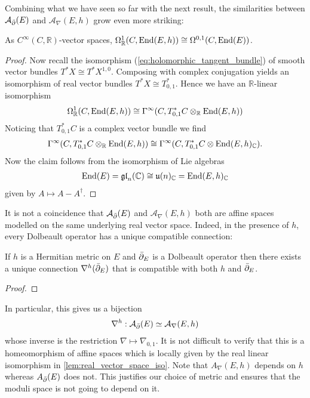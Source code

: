 \documentclass[12pt]{ociamthesis}  %
\begin{document}
Combining what we have seen so far with the next result, the
similarities between $\mathcal A_{\bar{\partial}} (E)$ and $\mathcal A_\nabla(E,h)$ grow even more
striking:

\begin{lemma}\label{lem:real_vector_space_iso}
  As $C^\infty(C,\mathbb R)$-vector spaces,
  $\Omega^1_{\mathbb{R}}(C,\operatorname{End}(E,h))\cong\Omega^{0,1}(C,\operatorname{End}(E))$.
  \begin{proof}
    Now recall the isomorphism (\ref{eq:holomorphic_tangent_bundle}) of
    smooth vector bundles $T^* X \cong T^*X^{1,0}$. Composing with
    complex conjugation yields an isomorphism of real vector bundles
    $T^*X \cong T^*_{0,1}$. Hence we have an $\mathbb{R}$-linear
    isomorphism
    \begin{align*}
      \Omega^1_{\mathbb{R}}(C,\operatorname{End}(E,h))
      \cong \Gamma^\infty(C,T^*_{0,1}C \otimes_{\mathbb{R}}\operatorname{End}(E,h))
    \end{align*}
    Noticing that $T_{0,1}^* C$ is a complex vector bundle
    we find
    \begin{align*}
      \Gamma^\infty(C,T^*_{0,1}C \otimes_{\mathbb{R}}\operatorname{End}(E,h))
      \cong\Gamma^\infty(C,T^*_{0,1}C \otimes\operatorname{End}(E,h)_{\mathbb{C}}).
    \end{align*}
    Now the claim follows from the isomorphism of Lie algebras
    \begin{align*}
      \operatorname{End}(E)
      =\mathfrak{gl}_n(\mathbb{C})
      \cong\mathfrak u(n)_{\mathbb{C}}
      =\operatorname{End}(E,h)_{\mathbb C}
    \end{align*}
    given by $A \mapsto A-A^\dagger$.
  \end{proof}
\end{lemma}

It is not a coincidence that $\mathcal A_{\bar{\partial}} (E)$ and $\mathcal A_\nabla(E,h)$ both are
affine spaces modelled on the same underlying real vector space.
Indeed, in the presence of $h$, every Dolbeault operator has a unique
compatible connection:

\begin{theorem}\label{thm:chern_connection}
  If $h$ is a Hermitian metric on $E$ and ${\bar{\partial}}_E$ is a Dolbeault
  operator then there exists a unique connection $\nabla^h({\bar{\partial}}_E)$
  that is compatible with both $h$ and ${\bar{\partial}}_E$.
  \begin{proof}
    \missingproof
  \end{proof}
\end{theorem}

In particular, this gives us a bijection
\begin{align*}
  \nabla^h : \mathcal A_{\bar{\partial}} (E) \simeq \mathcal A_\nabla(E,h)
\end{align*}
whose inverse is the restriction
$\nabla \mapsto \nabla_{0,1}$. It is not difficult to verify that this
is a homeomorphism of affine spaces which is locally given by
the real linear isomorphism in \ref{lem:real_vector_space_iso}.
Note that $A_\nabla(E,h)$ depends on $h$ whereas $A_{{\bar{\partial}}}(E)$ does
not. This justifies our choice of metric and ensures that the
moduli space is not going to depend on it.
\end{document}
